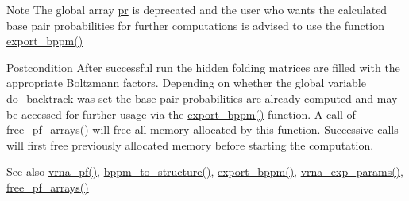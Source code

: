 \begin{DoxyNote}{Note}
The global array \hyperlink{fold__vars_8h_ac98ec419070aee6831b44e5c700f090f}{pr} is deprecated and the user who wants the calculated base pair probabilities for further computations is advised to use the function \hyperlink{group__pf__fold_gac5ac7ee281aae1c5cc5898a841178073}{export\+\_\+bppm()} 
\end{DoxyNote}
\begin{DoxyPostcond}{Postcondition}
After successful run the hidden folding matrices are filled with the appropriate Boltzmann factors. Depending on whether the global variable \hyperlink{group__model__details_gad512b5dd4dbec60faccfe137bb474489}{do\+\_\+backtrack} was set the base pair probabilities are already computed and may be accessed for further usage via the \hyperlink{group__pf__fold_gac5ac7ee281aae1c5cc5898a841178073}{export\+\_\+bppm()} function. A call of \hyperlink{group__pf__fold_gae73db3f49a94f0f72e067ecd12681dbd}{free\+\_\+pf\+\_\+arrays()} will free all memory allocated by this function. Successive calls will first free previously allocated memory before starting the computation. 
\end{DoxyPostcond}
\begin{DoxySeeAlso}{See also}
\hyperlink{group__pf__fold_ga29e256d688ad221b78d37f427e0e99bc}{vrna\+\_\+pf()}, \hyperlink{group__struct__utils_ga129d81c4a1ead793c5b2311333e03dfa}{bppm\+\_\+to\+\_\+structure()}, \hyperlink{group__pf__fold_gac5ac7ee281aae1c5cc5898a841178073}{export\+\_\+bppm()}, \hyperlink{group__energy__parameters_gab1f3016f96aa96bff020cdd904605afa}{vrna\+\_\+exp\+\_\+params()}, \hyperlink{group__pf__fold_gae73db3f49a94f0f72e067ecd12681dbd}{free\+\_\+pf\+\_\+arrays()} 
\end{DoxySeeAlso}

